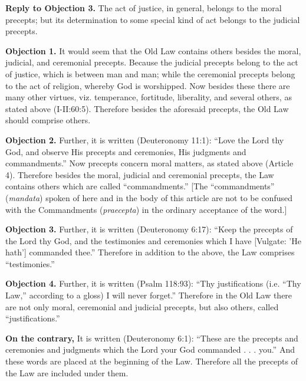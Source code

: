 \textbf{Reply to Objection 3.} The act of justice, in general, belongs to the moral precepts; but its determination to some special kind of act belongs to the judicial precepts.


\textbf{Objection 1.} It would seem that the Old Law contains others besides the moral, judicial, and ceremonial precepts. Because the judicial precepts belong to the act of justice, which is between man and man; while the ceremonial precepts belong to the act of religion, whereby God is worshipped. Now besides these there are many other virtues, viz. temperance, fortitude, liberality, and several others, as stated above (I-II:60:5). Therefore besides the aforesaid precepts, the Old Law should comprise others.

\textbf{Objection 2.} Further, it is written (Deuteronomy 11:1): ``Love the Lord thy God, and observe His precepts and ceremonies, His judgments and commandments.'' Now precepts concern moral matters, as stated above (Article 4). Therefore besides the moral, judicial and ceremonial precepts, the Law contains others which are called ``commandments.'' [The ``commandments'' (\emph{mandata}) spoken of here and in the body of this article are not to be confused with the Commandments (\emph{praecepta}) in the ordinary acceptance of the word.]

\textbf{Objection 3.} Further, it is written (Deuteronomy 6:17): ``Keep the precepts of the Lord thy God, and the testimonies and ceremonies which I have [Vulgate: 'He hath'] commanded thee.'' Therefore in addition to the above, the Law comprises ``testimonies.''

\textbf{Objection 4.} Further, it is written (Psalm 118:93): ``Thy justifications (i.e. ``Thy Law,'' according to a gloss) I will never forget.'' Therefore in the Old Law there are not only moral, ceremonial and judicial precepts, but also others, called ``justifications.''

\textbf{On the contrary,} It is written (Deuteronomy 6:1): ``These are the precepts and ceremonies and judgments which the Lord your God commanded . . . you.'' And these words are placed at the beginning of the Law. Therefore all the precepts of the Law are included under them.

